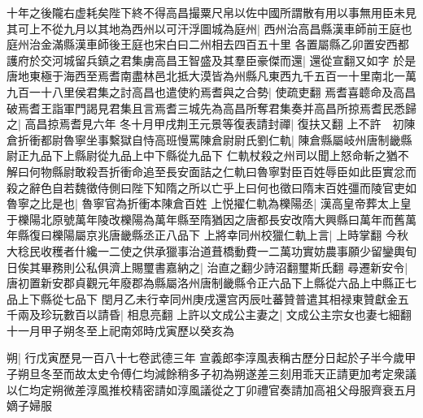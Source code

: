 十年之後隴右虚耗矣陛下終不得高昌撮粟尺帛以佐中國所謂散有用以事無用臣未見其可上不從九月以其地為西州以可汗浮圖城為庭州|{
	西州治高昌縣漢車師前王庭也庭州治金滿縣漢車師後王庭也宋白曰二州相去四百五十里}
各置屬縣乙卯置安西都護府於交河城留兵鎮之君集虜高昌王智盛及其羣臣豪傑而還|{
	還從宣翻又如字}
於是唐地東極于海西至焉耆南盡林邑北抵大漠皆為州縣凡東西九千五百一十里南北一萬九百一十八里侯君集之討高昌也遣使約焉耆與之合勢|{
	使疏吏翻}
焉耆喜聼命及高昌破焉耆王詣軍門謁見君集且言焉耆三城先為高昌所奪君集奏并高昌所掠焉耆民悉歸之|{
	高昌掠焉耆見六年}
冬十月甲戌荆王元景等復表請封禪|{
	復扶又翻}
上不許　初陳倉折衝都尉魯寧坐事繫獄自恃高班慢罵陳倉尉尉氏劉仁軌|{
	陳倉縣屬岐州唐制畿縣尉正九品下上縣尉從九品上中下縣從九品下}
仁軌杖殺之州司以聞上怒命斬之猶不解曰何物縣尉敢殺吾折衝命追至長安面詰之仁軌曰魯寧對臣百姓辱臣如此臣實忿而殺之辭色自若魏徵侍側曰陛下知隋之所以亡乎上曰何也徵曰隋末百姓彊而陵官吏如魯寧之比是也|{
	魯寧官為折衝本陳倉百姓}
上悦擢仁軌為櫟陽丞|{
	漢高皇帝葬太上皇于櫟陽北原號萬年陵改櫟陽為萬年縣至隋猶因之唐都長安改隋大興縣曰萬年而舊萬年縣復曰櫟陽屬京兆唐畿縣丞正八品下}
上將幸同州校獵仁軌上言|{
	上時掌翻}
今秋大稔民收穫者什纔一二使之供承獵事治道葺橋動費一二萬功實妨農事願少留鑾輿旬日俟其畢務則公私俱濟上賜璽書嘉納之|{
	治直之翻少詩沼翻璽斯氏翻}
尋遷新安令|{
	唐初置新安郡貞觀元年廢郡為縣屬洛州唐制畿縣令正六品下上縣從六品上中縣正七品上下縣從七品下}
閏月乙未行幸同州庚戌還宫丙辰吐蕃贊普遣其相禄東贊獻金五千兩及珍玩數百以請昏|{
	相息亮翻}
上許以文成公主妻之|{
	文成公主宗女也妻七細翻}
十一月甲子朔冬至上祀南郊時戊寅歷以癸亥為

朔|{
	行戊寅歷見一百八十七卷武德三年}
宣義郎李淳風表稱古歷分日起於子半今歲甲子朔旦冬至而故太史令傅仁均減餘稍多子初為朔遂差三刻用乖天正請更加考定衆議以仁均定朔微差淳風推校精密請如淳風議從之丁卯禮官奏請加高袓父母服齊衰五月嫡子婦服

